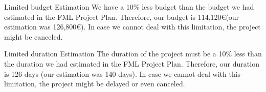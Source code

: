 \begin{risk}{Limited budget}
\riskcat Estimation
\riskdesc We have a 10\% less budget than the budget we had estimated in the FML Project Plan. Therefore, our budget is 114,120\euro (our estimation was 126,800\euro). In case we cannot deal with this limitation, the project might be canceled.
\end{risk}

\begin{risk}{Limited duration}
\riskcat Estimation
\riskdesc The duration of the project must be a 10\% less than the duration we had estimated in the FML Project Plan. Therefore, our duration is 126 days (our estimation was 140 days). In case we cannot deal with this limitation, the project might be delayed or even canceled.
\end{risk}
